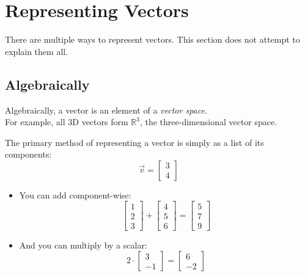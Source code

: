 \documentclass[12pt]{report}
\begin{document}
    \section{Representing Vectors}

    There are multiple ways to represent vectors. This section does not attempt to explain them all.
    
        \subsection{Algebraically}
            Algebraically, a vector is an element of a \emph{vector space}. \\
            For example, all 3D vectors form $\mathbb{R}^3$, the three-dimensional vector space.

            The primary method of representing a vector is simply as a list of its components:
            \begin{equation}
                \vec{v} = 
                \begin{bmatrix}
                    3 \\ 4
                \end{bmatrix}
            \end{equation}

            \begin{itemize}
                \item  You can add component-wise: \\
                \begin{equation}
                  \begin{bmatrix}1 \\ 2 \\ 3 \end{bmatrix} + \begin{bmatrix}4 \\ 5 \\ 6 \end{bmatrix} = \begin{bmatrix}5 \\ 7 \\ 9 \end{bmatrix}
                \end{equation}

                \item  And you can multiply by a scalar: \\
                \begin{equation}
                   2 \cdot \begin{bmatrix}3 \\ -1 \end{bmatrix} = \begin{bmatrix}6 \\ -2 \end{bmatrix}
                \end{equation}
            \end{itemize}
            
\end{document}
